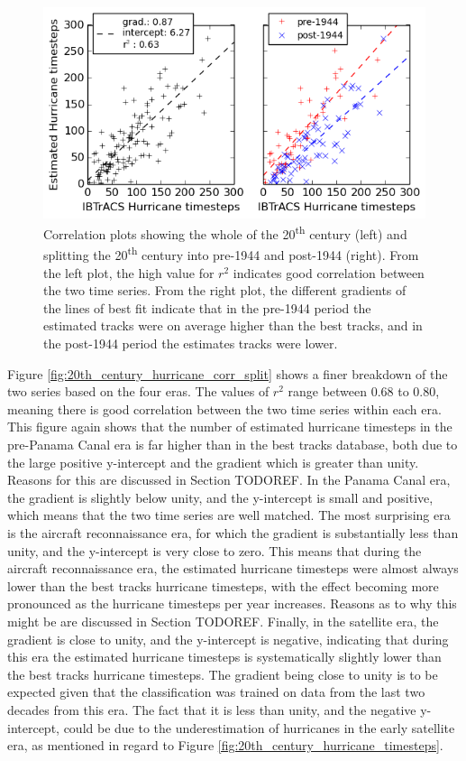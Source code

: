 \documentclass[pdftex,12pt,a4paper]{report}
\newcommand{\ts}{\textsuperscript}
\begin{document}
\begin{figure}[hb!]
    \centering
    \includegraphics[width=\textwidth]{figures/20th_century_corr}
    \caption{Correlation plots showing the whole of the 20\ts{th} century (left) and splitting the
    20\ts{th} century into pre-1944 and post-1944 (right). From the left plot, the high value for
    $r^2$ indicates good correlation between the two time series. From the right plot, the different
    gradients of the lines of best fit indicate that in the pre-1944 period the estimated tracks
    were on average higher than the best tracks, and in the post-1944 period the estimates tracks were
    lower. }
    \label{fig:20th_century_hurricane_corr}
\end{figure}

\newpage
Figure \ref{fig:20th_century_hurricane_corr_split} shows a finer breakdown of the two series based
on the four eras. The values of $r^2$ range between 0.68 to 0.80, meaning there is good correlation
between the two time series within each era. This figure again shows that the number of estimated
hurricane timesteps in the pre-Panama Canal era is far higher than in the best tracks database, both
due to the large positive y-intercept and the gradient which is greater than unity. Reasons for this
are discussed in Section TODOREF. In the Panama Canal era, the gradient is slightly below unity, and
the y-intercept is small and positive, which means that the two time series are well matched. The
most surprising era is the aircraft reconnaissance era, for which the gradient is substantially less
than unity, and the y-intercept is very close to zero. This means that during the aircraft
reconnaissance era, the estimated hurricane timesteps were almost always lower than the best tracks
hurricane timesteps, with the effect becoming more pronounced as the hurricane timesteps per year
increases.  Reasons as to why this might be are discussed in Section TODOREF. Finally, in the
satellite era, the gradient is close to unity, and the y-intercept is negative, indicating that
during this era the estimated hurricane timesteps is systematically slightly lower than the best
tracks hurricane timesteps. The gradient being close to unity is to be expected given that the
classification was trained on data from the last two decades from this era. The fact that it is less
than unity, and the negative y-intercept, could be due to the underestimation of hurricanes in the
early satellite era, as mentioned in regard to Figure \ref{fig:20th_century_hurricane_timesteps}.
\end{document}
